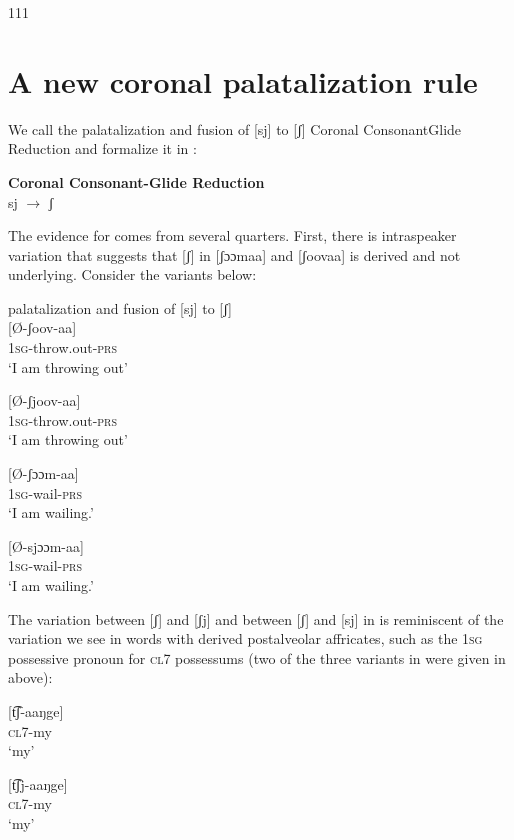 \documentclass[output=paper]{langsci/langscibook}
\begin{document}
\begin{tabular}{111}
\section{A new coronal palatalization rule}

We call the palatalization and fusion of [sj] to [ʃ] Coronal ConsonantGlide Reduction and formalize it in :


\ea\label{ex:glewwe:24}{}
 \textbf{Coronal Consonant-Glide Reduction}\\
 sj $\rightarrow$ ʃ\\{}
\z

The evidence for  comes from several quarters. First, there is intraspeaker variation that suggests that [ʃ] in [ʃɔɔmaa] and [ʃoovaa] is derived and not underlying. Consider the variants below:
 
\ea\label{ex:glewwe:25}{}
{palatalization and fusion of [sj] to [ʃ]} \\
   \ea\label{ex:glewwe:25a}
 [Ø-ʃoov-aa]\\{}
\textsc{1sg}-throw.out-\textsc{prs}\\{}
\glt ‘I am throwing out’

\ex\label{ex:glewwe:25b}{}
 [Ø-ʃjoov-aa]\\{}
\textsc{1sg}-throw.out-\textsc{prs}\\{}
\glt ‘I am throwing out’

\ex\label{ex:glewwe:25c}{}
 [Ø-ʃɔɔm-aa]\\{}
\textsc{1sg}-wail-\textsc{prs}\\{}
\textsc{‘I} am wailing.’

\ex\label{ex:glewwe:25d}{}
 [Ø-sjɔɔm-aa]\\{}
\textsc{1sg}-wail-\textsc{prs}\\{}
\glt ‘I am wailing.’
\z 
\z 

The variation between [ʃ] and [ʃj] and between [ʃ] and [sj] in  is reminiscent of the variation we see in words with derived postalveolar affricates, such as the 1\textsc{sg} possessive pronoun for \textsc{cl}7 possessums (two of the three variants in  were given in  above):

\ea\label{ex:glewwe:26}{}
   \ea\label{ex:glewwe:26a}
 [t͡ʃ-aaŋge]\\{}
\textsc{cl7}-my\\{}
\glt ‘my’

\ex\label{ex:glewwe:26b}{}
 [t͡ʃj-aaŋge]\\{}
\textsc{cl7}-my\\{}
\glt ‘my’


\end{tabular}
\end{document}
